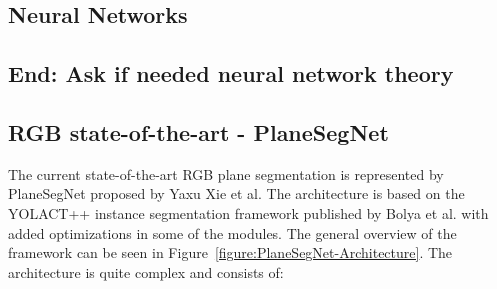 \subsection{Neural Networks} \label{subsec:neural-networks}

\subsection{End: Ask if needed neural network theory}

\subsection{RGB state-of-the-art - PlaneSegNet}

The current state-of-the-art RGB plane segmentation is represented by PlaneSegNet
proposed by Yaxu Xie et al. \cite{inproceedingsPlaneSegNet}
The architecture is based on the YOLACT++ instance segmentation framework published by
Bolya et al. \cite{articleYOLACT} with added optimizations in some of the modules.
The general overview of the framework can be seen in Figure~\ref{figure:PlaneSegNet-Architecture}.
The architecture is quite complex and consists of:

